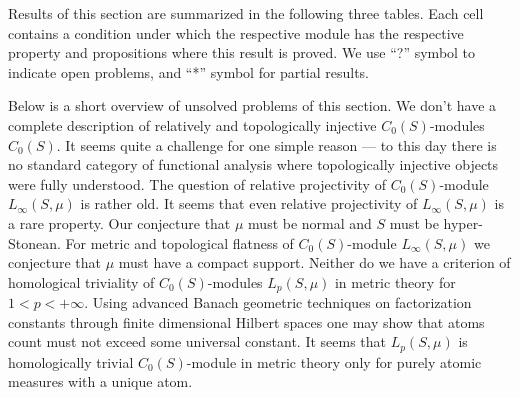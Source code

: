Results of this section are summarized in the following three tables. Each cell
contains a condition under which the respective module has the respective
property and propositions where this result is proved. We use ``?'' symbol to 
indicate open problems, and ``*'' symbol for partial results. 

Below is a short overview of unsolved problems of this section. We don't have 
a complete description of relatively and topologically injective $C_0(S)$-modules 
$C_0(S)$. It seems quite a challenge for one simple reason --- to this day there is 
no standard category of functional analysis where topologically injective 
objects were fully understood. The question of relative
projectivity of $C_0(S)$-module $L_\infty(S,\mu)$ is rather old. It seems that
even relative projectivity of $L_\infty(S,\mu)$ is a rare property. Our
conjecture that $\mu$ must be normal and $S$ must be hyper-Stonean. For metric and 
topological flatness of $C_0(S)$-module $L_\infty(S,\mu)$ we conjecture that $\mu$
must have a compact support. Neither do we have a criterion of homological triviality 
of $C_0(S)$-modules $L_p(S,\mu)$ in metric theory for $1<p<+\infty$. Using advanced
Banach geometric techniques on factorization constants through finite
dimensional Hilbert spaces one may show that atoms count must not exceed some 
universal constant. It seems that $L_p(S,\mu)$ is homologically trivial 
$C_0(S)$-module in metric theory only for purely atomic measures with a unique atom. 

